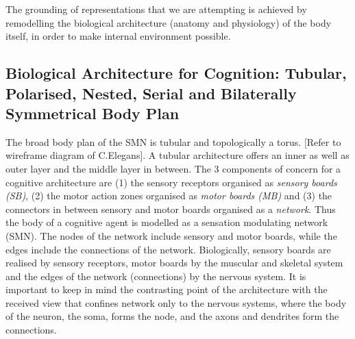 The grounding of representations that we are attempting is achieved by remodelling the biological architecture (anatomy and physiology) of the body itself, in order to make internal environment possible.

\subsection{Biological Architecture for Cognition: Tubular, Polarised, Nested, Serial and Bilaterally Symmetrical Body Plan}

The broad body plan of the SMN is tubular and topologically a torus. [Refer to wireframe diagram of C.Elegans]. A tubular architecture offers an inner as well as outer layer and the middle layer in between. The 3 components of concern for a cognitive architecture are (1) the sensory receptors organised as \textit{sensory boards (SB)}, (2) the motor action zones organised as \textit{motor boards (MB)} and (3) the connectors in between sensory and motor boards organised as a \textit{network}. Thus the body of a cognitive agent is modelled as a sensation modulating network (SMN). The nodes of the network include sensory and motor boards, while the edges include the connections of the network. Biologically, sensory boards are realised by sensory receptors, motor boards by the muscular and skeletal system and the edges of the network (connections) by the nervous system. It is important to keep in mind the contrasting point of the architecture with the received view that confines network only to the nervous systems, where the body of the neuron, the soma, forms the node, and the axons and dendrites form the connections.

